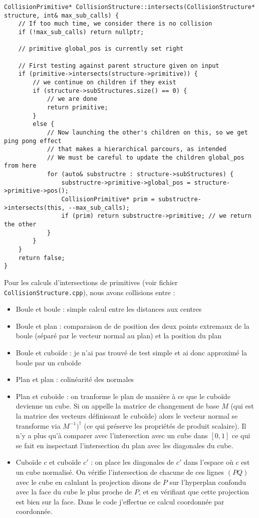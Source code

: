 \documentclass[10pt, a4paper]{article}
\theoremstyle{definition}
\begin{document}
\begin{lstlisting}
CollisionPrimitive* CollisionStructure::intersects(CollisionStructure* structure, int& max_sub_calls) {
	// If too much time, we consider there is no collision
	if (!max_sub_calls) return nullptr;

	// primitive global_pos is currently set right

	// First testing against parent structure given on input
	if (primitive->intersects(structure->primitive)) {
		// we continue on children if they exist
		if (structure->subStructures.size() == 0) {
			// we are done
			return primitive;
		}
		else {
			// Now launching the other's children on this, so we get ping pong effect
			// that makes a hierarchical parcours, as intended
			// We must be careful to update the children global_pos from here
			for (auto& substructre : structure->subStructures) {
				substructre->primitive->global_pos = structure->primitive->pos();
				CollisionPrimitive* prim = substructre->intersects(this, --max_sub_calls);
				if (prim) return substructre->primitive; // we return the other 
			}
		}
	}
	return false;
}
\end{lstlisting}

Pour les calculs d'intersections de primitives (voir fichier \texttt{CollisionStructure.cpp}), nous avons collisions entre : 
\begin{itemize}
	\item Boule et boule : simple calcul entre les distances aux centres
	\item Boule et plan : comparaison de de position des deux points extremaux de la boule (séparé par le vecteur normal au plan) et la position du plan
	\item Boule et cuboïde : je n'ai pas trouvé de test simple et ai donc approximé la boule par un cuboïde
	\item Plan et plan : colinéarité des normales
	\item Plan et cuboïde : on tranforme le plan de manière à ce que le cuboïde devienne un cube. Si on appelle la matrice de changement de base $M$ (qui est la matrice des vecteurs définissant le cuboïde) alors le vecteur normal se transforme via $M^{-1})^\dagger$ (ce qui préserve les propriétés de produit scalaire). Il n'y a plus qu'à comparer avec l'intersection avec un cube dans $[0,1] $  ce qui se fait en inspectant l'intersection du plan avec les diagonales du cube.
	\item Cuboïde $c$ et cuboïde $c'$ : on place les diagonales de $c'$ dans l'espace où $c$ est un cube normalisé. On vérifie l'intersection de chacune de ces lignes $(PQ)$ avec le cube en calulant la projection disons de $P$ sur l'hyperplan confondu avec la face du cube le plus proche de $P$, et en vérifiant que cette projection est bien sur la face. Dans le code j'effectue ce calcul coordonnée par coordonnée.
\end{itemize}
\end{document}
